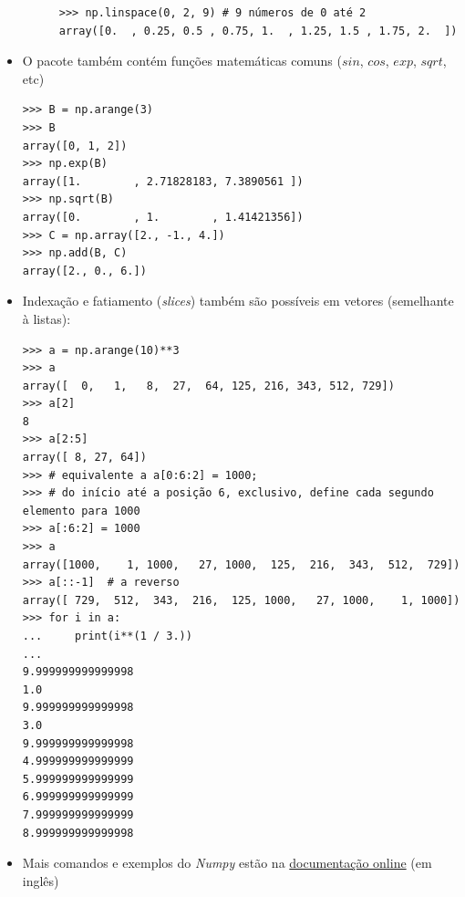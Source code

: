 \begin{itemize}
\begin{description}
\begin{verbatim}
>>> np.linspace(0, 2, 9) # 9 números de 0 até 2
array([0.  , 0.25, 0.5 , 0.75, 1.  , 1.25, 1.5 , 1.75, 2.  ])
		\end{verbatim}
	\end{description}
	\item O pacote também contém funções matemáticas comuns ($sin$, $cos$, $exp$, $sqrt$, etc)
	\begin{verbatim}
>>> B = np.arange(3)
>>> B
array([0, 1, 2])
>>> np.exp(B)
array([1.        , 2.71828183, 7.3890561 ])
>>> np.sqrt(B)
array([0.        , 1.        , 1.41421356])
>>> C = np.array([2., -1., 4.])
>>> np.add(B, C)
array([2., 0., 6.])
	\end{verbatim}
	\item Indexação e fatiamento (\textit{slices}) também são possíveis em vetores (semelhante à listas):
	\begin{verbatim}
>>> a = np.arange(10)**3
>>> a
array([  0,   1,   8,  27,  64, 125, 216, 343, 512, 729])
>>> a[2]
8
>>> a[2:5]
array([ 8, 27, 64])
>>> # equivalente a a[0:6:2] = 1000;
>>> # do início até a posição 6, exclusivo, define cada segundo elemento para 1000
>>> a[:6:2] = 1000
>>> a
array([1000,    1, 1000,   27, 1000,  125,  216,  343,  512,  729])
>>> a[::-1]  # a reverso
array([ 729,  512,  343,  216,  125, 1000,   27, 1000,    1, 1000])
>>> for i in a:
...     print(i**(1 / 3.))
...
9.999999999999998
1.0
9.999999999999998
3.0
9.999999999999998
4.999999999999999
5.999999999999999
6.999999999999999
7.999999999999999
8.999999999999998
	\end{verbatim}
	\item Mais comandos e exemplos do \textit{Numpy} estão na \href{https://numpy.org/doc/stable/}{documentação online} (em inglês)
\end{itemize}

